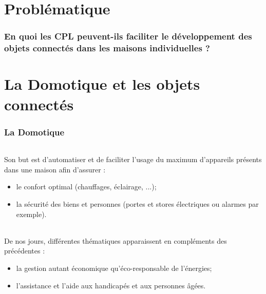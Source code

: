 \part*{Problématique}
    \section*{En quoi les CPL peuvent-ils faciliter le développement des objets connectés dans les maisons individuelles ?}
    \clearpage



\part{La Domotique et les objets connectés}

    \section{La Domotique}

        \paragraph{}
Son but est d’automatiser et de faciliter l'usage du maximum d'appareils présents dans une maison afin d'assurer :
            \begin{itemize}
                \item le confort optimal (chauffages, éclairage, ...);
                \item la sécurité des biens et personnes (portes et stores électriques ou alarmes par exemple).
            \end{itemize}

        \paragraph{}
De nos jours, différentes thématiques apparaissent en compléments des précédentes :
            \begin{itemize}
                \item la gestion autant économique qu'éco-responsable de l'énergies;
                \item l'assistance et l'aide aux handicapés et aux personnes âgées.
            \end{itemize}

